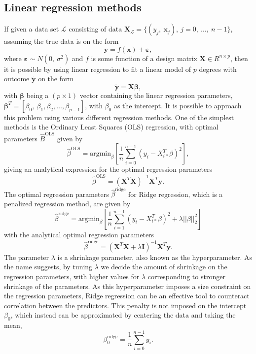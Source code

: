 \documentclass[a4paper, 10pt]{article}
\begin{document}
\begin{multicols}{2}
\subsection{Linear regression methods}
If given a data set $\mathcal{L}$ consisting of data $\bm{X}_\mathcal{L} = \{(y_j,\ \bm{x}_j),\ j=0,\ \dots,\ n-1\}$, assuming the true data is on the form
\[
\bm{y} = f(\bm{x})+ \bm{\varepsilon} ,
\]
where $\bm{\varepsilon} \sim N(0,\ \sigma ^2)$ and $f$ is some function of a design matrix $\bm{X}\in R^{n\times p}$, then it is possible by using linear regression to fit a linear model of $p$ degrees with outcome $\bm{\tilde{y}}$ on the form
\[
\bm{\tilde{y}} = \bm{X}\bm{\beta},
\]
with $\bm{\beta}$ being a $(p\times 1)$ vector containing the linear regression parameters, $\bm{\beta}^T=[\beta_0,\ \beta_1, \beta_2,\dots,\beta_{p-1}]$, with $\beta_0$ as the intercept. 
It is possible to approach this problem using various different regression methods. One of the simplest methods is the Ordinary Least Squares (OLS) regression, with optimal  parameters $\hat{B}^\text{OLS}$ given by
\begin{equation}
    \hat{\beta}^\text{OLS} = \text{argmin}_{ {\beta} } \left[ \frac{1}{n} \sum_{i=0}^{n-1} (y_i - X_{i*}^T \beta)^2 \right],
    \label{eq:argminbeta_OLS}
\end{equation}
giving an analytical expression for the optimal regression parameters
\begin{equation}
    \hat{\beta}^{\text{OLS}} = (\bm{X}^T\bm{X})^{-1} \bm{X}^T \bm{y}.
    \label{eq:beta_OLS}
\end{equation}
The optimal regression parameters $\hat{\beta}^\text{ridge}$ for Ridge regression, which is a penalized regression method, are given by
\begin{equation}
    \hat{\beta}^\text{ridge} = \text{argmin}_\beta \left[ \frac{1}{n}\sum_{i=1}^{n-1}(y_i-X_{i*}^T\beta)^2 + \lambda ||\beta||_2^2  \right]
    \label{eq:argminbeta_ridge}
\end{equation}
with the analytical optimal regression parameters
\begin{equation}
    \hat{\beta}^\text{ridge} = (\bm{X}^T\bm{X} +\lambda \bm{I})^{-1} \bm{X}^T \bm{y}.
    \label{eq:beta_ridge}
\end{equation}
The parameter $\lambda$ is a shrinkage parameter, also known as the hyperparameter. As the name suggests, by tuning $\lambda$ we decide the amount of shrinkage on the regression parameters, with higher values for $\lambda$ corresponding to stronger shrinkage of the parameters. As this hyperparameter imposes a size constraint on the regression parameters, Ridge regression can be an effective tool to counteract correlation between the predictors. This penalty is not imposed on the intercept $\beta_0$, which instead can be approximated by centering the data and taking the mean, 
\begin{equation}
	\beta_0^\text{ridge}=\frac{1}{n}\sum_{i=0}^{n-1}y_i.
\end{equation}


\end{multicols}
\end{document}
